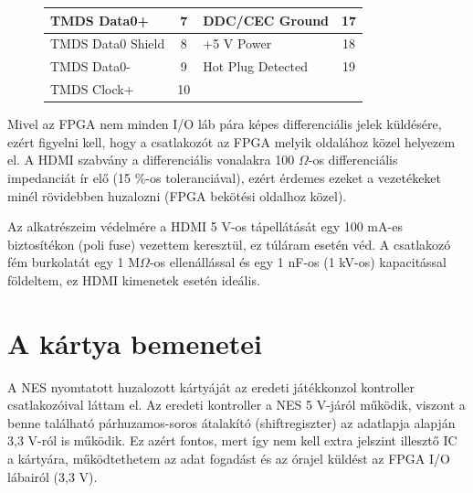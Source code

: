 \begin{figure}[H]
\begin{minipage}[]{\textwidth}
\begin{minipage}[b]{0.59\textwidth}
\begin{tabular}{|l|c|l|c|}
				TMDS Data0+       & 7                                                                                & DDC/CEC Ground    & 17                                                                               \\ \hline
				TMDS Data0 Shield & 8                                                                                & +5 V Power        & 18                                                                               \\ \hline
				TMDS Data0-       & 9                                                                                & Hot Plug Detected & 19                                                                               \\ \hline
				TMDS Clock+       & 10                                                                               &                   & \multicolumn{1}{l|}{}                                                            \\ \hline
			\end{tabular}
			\label{tab:HDMI-pinout}
		\end{minipage}
	\end{minipage}
	\end{figure} 
	
	Mivel az FPGA nem minden I/O láb pára képes differenciális jelek küldésére, ezért figyelni kell, hogy a csatlakozót az FPGA melyik oldalához közel helyezem el. A HDMI szabvány a differenciális vonalakra 100 $\Omega$-os differenciális impedanciát ír elő (15 \%-os toleranciával), ezért érdemes ezeket a vezetékeket minél rövidebben huzalozni (FPGA bekötési oldalhoz közel). 
	
	Az alkatrészeim védelmére a HDMI 5 V-os tápellátását egy 100 mA-es biztosítékon (poli fuse) vezettem keresztül, ez túláram esetén véd. A csatlakozó fém burkolatát egy 1 M$\Omega$-os ellenállással és egy 1 nF-os (1 kV-os) kapacitással földeltem, ez HDMI kimenetek esetén ideális. 
	
\section{A kártya bemenetei}
	
	A NES nyomtatott huzalozott kártyáját az eredeti játékkonzol kontroller csatlakozóival láttam el. Az eredeti kontroller a NES 5 V-járól működik, viszont a benne található párhuzamos-soros átalakító (shiftregiszter) az adatlapja alapján 3,3 V-ról is működik. Ez azért fontos, mert így nem kell extra jelszint illesztő IC a kártyára, működtethetem az adat fogadást és az órajel küldést az FPGA I/O lábairól (3,3 V).
	
